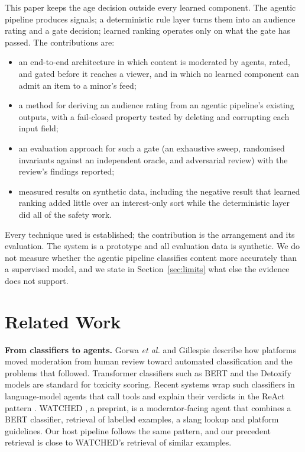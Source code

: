 \documentclass[conference]{IEEEtran}
\begin{document}
This paper keeps the age decision outside every learned component. The agentic pipeline produces signals; a deterministic rule layer turns them into an audience rating and a gate decision; learned ranking operates only on what the gate has passed. The contributions are:

\begin{itemize}
\item an end-to-end architecture in which content is moderated by agents, rated, and gated before it reaches a viewer, and in which no learned component can admit an item to a minor's feed;
\item a method for deriving an audience rating from an agentic pipeline's existing outputs, with a fail-closed property tested by deleting and corrupting each input field;
\item an evaluation approach for such a gate (an exhaustive sweep, randomised invariants against an independent oracle, and adversarial review) with the review's findings reported;
\item measured results on synthetic data, including the negative result that learned ranking added little over an interest-only sort while the deterministic layer did all of the safety work.
\end{itemize}

Every technique used is established; the contribution is the arrangement and its evaluation. The system is a prototype and all evaluation data is synthetic. We do not measure whether the agentic pipeline classifies content more accurately than a supervised model, and we state in Section~\ref{sec:limits} what else the evidence does not support.

\section{Related Work}

\textbf{From classifiers to agents.} Gorwa \emph{et al.} \cite{gorwa2020algorithmic} and Gillespie \cite{gillespie2018custodians} describe how platforms moved moderation from human review toward automated classification and the problems that followed. Transformer classifiers such as BERT \cite{devlin2019bert} and the Detoxify models \cite{hanu2020detoxify} are standard for toxicity scoring. Recent systems wrap such classifiers in language-model agents that call tools and explain their verdicts in the ReAct pattern \cite{yao2023react}. WATCHED \cite{piot2025watched}, a preprint, is a moderator-facing agent that combines a BERT classifier, retrieval of labelled examples, a slang lookup and platform guidelines. Our host pipeline follows the same pattern, and our precedent retrieval is close to WATCHED's retrieval of similar examples.
\end{document}
